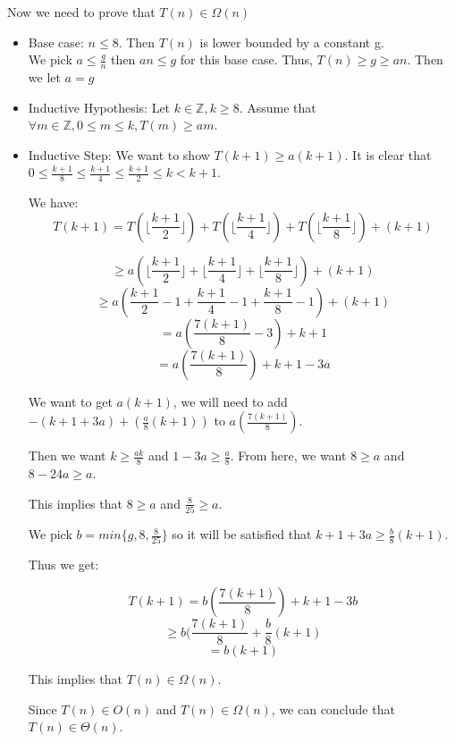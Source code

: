 \documentclass{cpsc413Solutions}
\begin{document}
\begin{problemlist}
\begin{problem}
\begin{answer}
\begin{enumerate}
    Now we need to prove that $T(n) \in  \Omega(n)$
    
    \begin{itemize}
       \item Base case: $n \leq 8$. Then $T(n)$ is lower bounded by a constant g.\\
       We pick $a \leq \frac{g}{n}$ then $an\leq g$ for this base case. Thus, $T(n)\geq g \geq an$. Then we let $a=g$
       
       \item Inductive Hypothesis: Let $k \in \mathds{Z}, k \geq 8$. Assume that $\forall m \in \mathds{Z},0\leq m \leq k,T(m) \geq am$.
       
       \item Inductive Step: We want to show $T(k+1) \geq a(k+1)$. It is clear that $0 \leq \frac{k+1}{8} \leq \frac{k+1}{4} \leq \frac{k+1}{2} \leq k < k+1$. 
       
        We have:\\
        $$T(k+1) = T(\lfloor\frac{k+1}{2}\rfloor) + T(\lfloor\frac{k+1}{4}\rfloor) + T(\lfloor\frac{k+1}{8}\rfloor) + (k+1)$$
        
        $$\geq a (\lfloor\frac{k+1}{2}\rfloor+\lfloor\frac{k+1}{4}\rfloor+\lfloor \frac{k+1}{8}\rfloor) + (k+1)$$
        $$\geq a (\frac{k+1}{2} -1 +\frac{k+1}{4} - 1 +\frac{k+1}{8} - 1) + (k+1)$$
        $$ = a(\frac{7(k+1)}{8}-3)+k+1$$
        $$=a(\frac{7(k+1)}{8}) + k +1 - 3a$$
        
       We want to get $a(k+1)$, we will need to add $-(k+1+3a) + (\frac{a}{8}(k+1))$ to $a(\frac{7(k+1)}{8})$. 
       
       Then we want $k \geq \frac{ak}{8}$ and $1-3a \geq \frac{a}{8}$. From here, we want $8 \geq a$ and $8-24a \geq a$.
       
       This implies that $8\geq a$ and $\frac{8}{25} \geq a$.
       
       We pick $b = min \{g,8,\frac{8}{25} \}$ so it will be satisfied that $k+1+3a \geq \frac{b}{8}(k+1)$.
       
       Thus we get:
       
       $$T(k+1) = b(\frac{7(k+1)}{8}) +k +1-3b$$
       $$\geq b(\frac{7(k+1)}{8} + \frac{b}{8}(k+1) $$
       $$= b(k+1)$$
       
       This implies that $T(n) \in \Omega(n)$.
       
       Since $T(n) \in O(n)$ and $T(n) \in \Omega(n)$, we can conclude that $T(n) \in \Theta(n)$.
       

\end{itemize}
\end{enumerate}
\end{answer}
\end{problem}
\end{problemlist}
\end{document}
